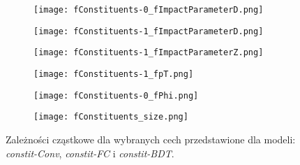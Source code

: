 \begin{figure}[ht]
	\centering
    \begin{subfigure}[b]{\newWidth}
	\texttt{[image: fConstituents-0\_fImpactParameterD.png]}
	\caption{}
	\end{subfigure}
    \begin{subfigure}[b]{\newWidth}
	\texttt{[image: fConstituents-1\_fImpactParameterD.png]}
	\caption{}
	\end{subfigure}
    \begin{subfigure}[b]{\newWidth}
	\texttt{[image: fConstituents-1\_fImpactParameterZ.png]}
	\caption{}
	\end{subfigure}
    \begin{subfigure}[b]{\newWidth}
	\texttt{[image: fConstituents-1\_fpT.png]}
	\caption{}
	\end{subfigure}
    \begin{subfigure}[b]{\newWidth}
	\texttt{[image: fConstituents-0\_fPhi.png]}
	\caption{}
	\end{subfigure}
    \begin{subfigure}[b]{\newWidth}
	\texttt{[image: fConstituents\_size.png]}
	\caption{}
	\end{subfigure}
	\caption{Zależności cząstkowe dla wybranych cech przedstawione dla modeli: \textit{constit-Conv}, \textit{constit-FC} i \textit{constit-BDT}.}
	\label{fig:pdp-constit}
\end{figure}


%





%






